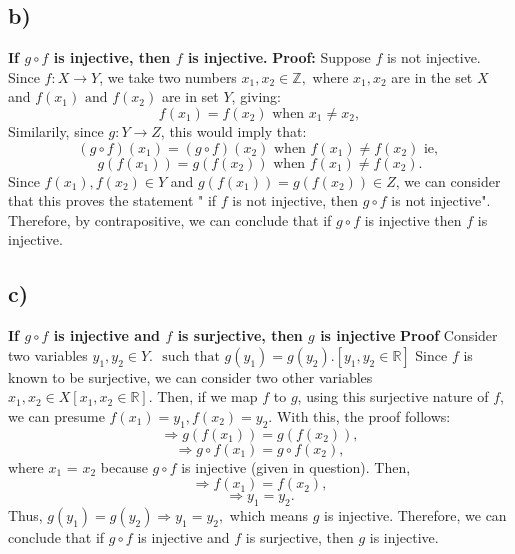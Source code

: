 \documentclass{article}
\begin{document}
\subsection{b)}
\textbf{ If $g \circ f$ is injective, then $f$ is injective. }
\newline
\newline
\textbf{Proof: } Suppose $f$ is not injective. 
Since $f: X \rightarrow Y$, we take two numbers $x_1, x_2 \in \mathbb{Z},$ where $x_1, x_2$ are in the set $X$ and $f(x_1) \text{ and } f(x_2)$ are in set $Y$, giving:
$$f(x_1) = f(x_2) \text{ when } x_1 \not = x_2,$$
Similarily, since $g: Y \rightarrow Z$, this would imply that:
$$(g \circ f)(x_1) = (g \circ f)(x_2) \text{ when } f(x_1) \not = f(x_2) \text{ ie, }$$
$$g(f(x_1)) = g(f(x_2)) \text{ when } f(x_1) \not = f(x_2).$$
\newline
Since $f(x_1), f(x_2) \in Y$ and $g(f(x_1)) = g(f(x_2)) \in Z$, we can consider that this proves the statement " if $f$ is not injective, then $g \circ f$ is not injective".
\newline
\newline
Therefore, by contrapositive, we can conclude that if $g \circ f$ is injective then $f$ is injective.
\newpage
\subsection{c)}
\textbf{ If $g \circ f$ is injective and $f$ is surjective, then $g$ is injective}
\newline
\newline
\textbf{Proof }
Consider two variables $y_1, y_2 \in  Y.$  $\text{ such that } g(y_1) = g(y_2). [y_1, y_2 \in \mathbb{R}]$
\newline
\newline
Since $f$ is known to be surjective, we can consider two other variables $x_1, x_2 \in X [x_1, x_2 \in \mathbb{R}].$
\newline
\newline
Then, if we map $f$ to $g$, using this surjective nature of $f$, we can presume $f(x_1) = y_1, f(x_2) = y_2.$ With this, the proof follows:
$$\Rightarrow g(f(x_1)) = g(f(x_2)),$$
$$\Rightarrow g \circ f(x_1) = g \circ f(x_2),$$
where $x_1$ = $x_2$ because $g \circ f$ is injective (given in question).
\newline
Then,
$$\Rightarrow f(x_1) = f(x_2),$$
$$\Rightarrow y_1 = y_2.$$
Thus, $g(y_1) = g(y_2) \Rightarrow y_1 = y_2,$ which means $g$ is injective. 
\newline
\newline
Therefore, we can conclude that if $g \circ f$ is injective and $f$ is surjective, then $g$ is injective.
\end{document}
